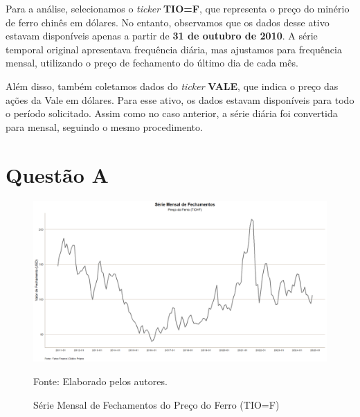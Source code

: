 \documentclass[a4paper,12pt]{article}[abntex2]
\begin{document}
Para a análise, selecionamos o \textit{ticker} \textbf{TIO=F}, que representa o preço do minério de ferro chinês em dólares. No entanto, observamos que os dados desse ativo estavam disponíveis apenas a partir de \textbf{31 de outubro de 2010}. A série temporal original apresentava frequência diária, mas ajustamos para frequência mensal, utilizando o preço de fechamento do último dia de cada mês.

Além disso, também coletamos dados do \textit{ticker} \textbf{VALE}, que indica o preço das ações da Vale em dólares. Para esse ativo, os dados estavam disponíveis para todo o período solicitado. Assim como no caso anterior, a série diária foi convertida para mensal, seguindo o mesmo procedimento.

\section*{\textbf{Questão A}}

\begin{figure}[H]
    \centering
    \caption{Série Mensal de Fechamentos do Preço do Ferro (TIO=F)} 
    \includegraphics[width=1.0\textwidth]{APS 2/i1qA.png}
    \label{fig:i1qA}
    
    \footnotesize{Fonte: Elaborado pelos autores.}
    \end{figure}
\end{document}
